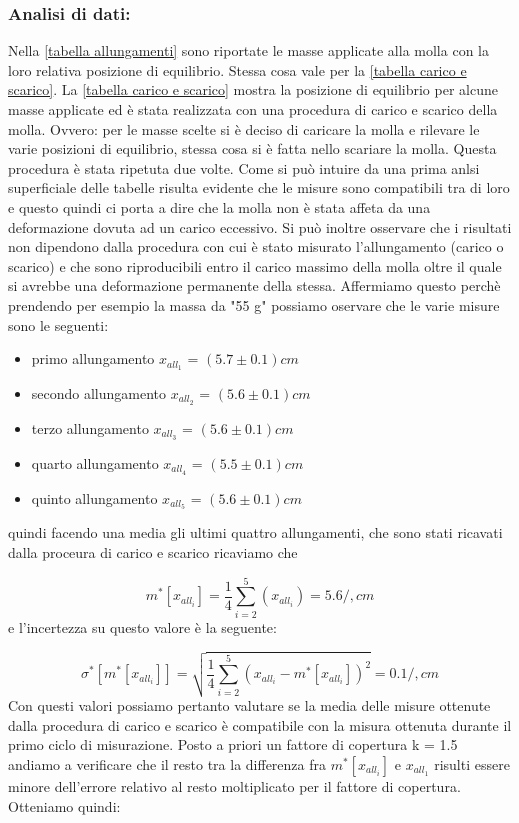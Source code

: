 \subsubsection{Analisi di dati:}
Nella \ref{tabella allungamenti} sono riportate le masse applicate alla molla con la loro relativa posizione di equilibrio. Stessa cosa vale per la \ref{tabella carico e scarico}.
La \ref{tabella carico e scarico} mostra la posizione di equilibrio per alcune masse applicate ed è stata realizzata con una procedura di carico e scarico della molla. Ovvero: per le masse scelte si è deciso di caricare la molla e rilevare le varie posizioni di equilibrio, stessa cosa si è fatta nello scariare la molla. Questa procedura è stata ripetuta due volte.
Come si può intuire da una prima anlsi superficiale delle tabelle risulta evidente che le misure sono compatibili tra di loro e questo quindi ci porta a dire che la molla non è stata affeta da una deformazione dovuta ad un carico eccessivo. Si può inoltre osservare che i risultati non dipendono dalla procedura con cui è stato misurato l'allungamento (carico o scarico) e che sono riproducibili entro il carico massimo della molla oltre il quale si avrebbe una deformazione permanente della stessa.
Affermiamo questo perchè prendendo per esempio la massa da "55 g" possiamo oservare che le varie misure sono le seguenti:
\begin{itemize}
	\item{primo allungamento $x_{all_1}$ = $(5.7 \pm 0.1) cm$}
	\item{secondo allungamento $x_{all_2}$ = $(5.6 \pm 0.1) cm$}
	\item{terzo allungamento $x_{all_3}$ = $(5.6 \pm 0.1) cm$}
	\item{quarto allungamento $x_{all_4}$ = $(5.5 \pm 0.1) cm$}
	\item{quinto allungamento $x_{all_5}$ = $(5.6 \pm 0.1) cm$}
\end{itemize}
quindi facendo una media gli ultimi quattro allungamenti, che sono stati ricavati dalla proceura di carico e scarico ricaviamo che

\begin{equation*}
	m^*[x_{all_i}] = \frac{1}{4} \sum_{i=2}^{5} (x_{all_i}) = 5.6/, cm
\end{equation*}
e l'incertezza su questo valore è la seguente:

\begin{equation*}
	\sigma^*[m^*[x_{all_i}]] = \sqrt{\frac{1}{4} \sum_{i=2}^{5} (x_{all_i} - m^*[x_{all_i}])^2} = 0.1/, cm
\end{equation*}
Con questi valori possiamo pertanto valutare se la media delle misure ottenute dalla procedura di carico e scarico è compatibile con la misura ottenuta durante il primo ciclo di misurazione. Posto a priori un fattore di copertura k = 1.5 andiamo a verificare che il resto tra la differenza fra $m^*[x_{all_i}]$ e $x_{all_1}$ risulti essere minore dell'errore relativo al resto moltiplicato per il fattore di copertura.
Otteniamo quindi:

